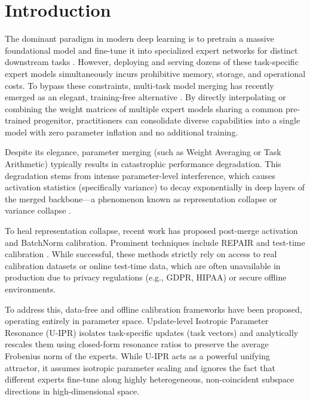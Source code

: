 \documentclass{article}
\theoremstyle{plain}
\theoremstyle{definition}
\theoremstyle{remark}
\begin{document}
\printAffiliationsAndNotice{}  %

\section{Introduction}
\label{sec:intro}

The dominant paradigm in modern deep learning is to pretrain a massive foundational model and fine-tune it into specialized expert networks for distinct downstream tasks \citep{wortsman2022model}. However, deploying and serving dozens of these task-specific expert models simultaneously incurs prohibitive memory, storage, and operational costs. To bypass these constraints, multi-task model merging has recently emerged as an elegant, training-free alternative \citep{ilharco2022editing}. By directly interpolating or combining the weight matrices of multiple expert models sharing a common pre-trained progenitor, practitioners can consolidate diverse capabilities into a single model with zero parameter inflation and no additional training.

Despite its elegance, parameter merging (such as Weight Averaging or Task Arithmetic) typically results in catastrophic performance degradation. This degradation stems from intense parameter-level interference, which causes activation statistics (specifically variance) to decay exponentially in deep layers of the merged backbone---a phenomenon known as representation collapse or variance collapse \citep{jordan2023repair, anonymous2026isotropic}.

To heal representation collapse, recent work has proposed post-merge activation and BatchNorm calibration. Prominent techniques include REPAIR \citep{jordan2023repair} and test-time calibration \citep{anonymous2026comprehensive}. While successful, these methods strictly rely on access to real calibration datasets or online test-time data, which are often unavailable in production due to privacy regulations (e.g., GDPR, HIPAA) or secure offline environments.

To address this, data-free and offline calibration frameworks have been proposed, operating entirely in parameter space. Update-level Isotropic Parameter Resonance (U-IPR) \citep{anonymous2026isotropic} isolates task-specific updates (task vectors) and analytically rescales them using closed-form resonance ratios to preserve the average Frobenius norm of the experts. While U-IPR acts as a powerful unifying attractor, it assumes isotropic parameter scaling and ignores the fact that different experts fine-tune along highly heterogeneous, non-coincident subspace directions in high-dimensional space.
\end{document}
